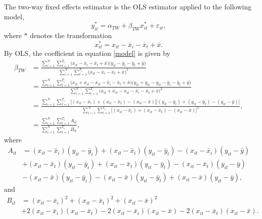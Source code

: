 \documentclass{article}[12pt]
\newenvironment{proof}[1][Proof.]{\begin{trivlist}
\item[\hskip \labelsep {\bfseries #1}]}{\end{trivlist}}
\begin{document}
\begin{proof}
The two-way fixed effects estimator is the OLS estimator applied to the following model,
\begin{equation}\label{model}
y_{it}^* = \alpha_{TW} + \beta_{TW} x_{it}^* + \varepsilon_{it}, 
\end{equation}
where $*$ denotes the transformation
\begin{equation}
x_{it}^* = x_{it} - \bar{x}_i - \bar{x}_t + \bar{x}.
\end{equation}
By OLS, the coefficient in equation \ref{model} is given by
\begin{align}
\beta_{TW} & =  \frac{\sum_{i=1}^N\sum_{t=1}^{T_i}\Big(x_{it} - \bar{x}_i - \bar{x}_t + \bar{x}\Big)\Big(y_{it} - \bar{y}_i - \bar{y}_t + \bar{y}\Big)}{\sum_{i=1}^N\sum_{t=1}^{T_i}\Big(x_{it} - \bar{x}_i - \bar{x}_t + \bar{x}\Big)^2}\nonumber\\
& =\frac{\sum_{i=1}^N\sum_{t=1}^{T_i} \Big(x_{it}  + x_{it} - x_{it} - \bar{x}_i - \bar{x}_t + \bar{x}\Big)\Big(y_{it} + y_{it} - y_{it} - \bar{y}_i - \bar{y}_t + \bar{y}\Big)}{\sum_{i=1}^N\sum_{t=1}^{T_i}\Big(x_{it} + x_{it} - x_{it} - \bar{x}_i - \bar{x}_t + \bar{x}\Big)^2}\nonumber\\
& =\frac{\sum_{i=1}^N\sum_{t=1}^{T_i} \Big[(x_{it}  - \bar{x}_i) + (x_{it}  - \bar{x}_t ) - (x_{it}- \bar{x})\Big]\Big[(y_{it}  - \bar{y}_i) + (y_{it}  - \bar{y}_t ) - (y_{it}- \bar{y})\Big]}{\sum_{i=1}^N\sum_{t=1}^{T_i}\Big[(x_{it}  - \bar{x}_i) + (x_{it}  - \bar{x}_t ) - (x_{it}- \bar{x})\Big]^2},\nonumber\\
& = \frac{\sum_{i=1}^N\sum_{t=1}^{T_i} A_{it}}{\sum_{i=1}^N\sum_{t=1}^{T_i} B_{it}},\label{ols2}
\end{align}
where
\begin{align}
A_{it} & =  (x_{it}  - \bar{x}_i)(y_{it}  - \bar{y}_i) + (x_{it}  - \bar{x}_i)(y_{it}  - \bar{y}_t) - (x_{it}  - \bar{x}_i)(y_{it}  - \bar{y}) \nonumber\\
&+ (x_{it}  - \bar{x}_t)(y_{it}  - \bar{y}_i)+ (x_{it}  - \bar{x}_t)(y_{it}  - \bar{y}_t) - (x_{it}  - \bar{x}_t)(y_{it}  - \bar{y}) \nonumber\\
&-  (x_{it}  - \bar{x})(y_{it}  - \bar{y}_i) - (x_{it}  - \bar{x})(y_{it}  - \bar{y}_t) + (x_{it}  - \bar{x})(y_{it}  - \bar{y}),
\end{align}
and
\begin{align}
B_{it} & =  (x_{it}  - \bar{x}_i)^2 + (x_{it}  - \bar{x}_t)^2 + (x_{it}  - \bar{x})^2 \nonumber\\
&+ 2(x_{it}  - \bar{x}_i)(x_{it}  - \bar{x}_t) - 2(x_{it}  - \bar{x}_i)(x_{it}  - \bar{x}) - 2(x_{it}  - \bar{x}_t)(x_{it}  - \bar{x}).

\end{align}
\end{proof}
\end{document}
